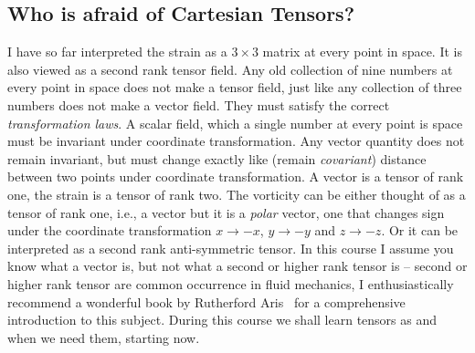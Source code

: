 \documentclass{tufte-book} %
\begin{document}
\begin{subappendices}
\section{Who is afraid of Cartesian Tensors?}
I have so far interpreted the strain as a $3\times 3$ matrix at every
point in space. It is also viewed as a second rank tensor field. 
Any old collection of nine numbers at every point in space does not
make a tensor field, just like any collection of three numbers does
not make a vector field. They must satisfy the correct
\textit{transformation laws}. 
 A scalar field, which a single number
at every point is space must be invariant under coordinate
transformation. Any vector quantity does not remain invariant, but must change
exactly like (remain \textit{covariant})  distance between two points
under coordinate transformation. A vector is a tensor of rank one, the
strain is a tensor of rank two. The vorticity can be either thought of
as a tensor of rank one, i.e., a vector but it is a \textit{polar}
vector, one that changes sign under the coordinate transformation
$x\to -x$, $y\to -y$ and $z\to -z$. Or it can be interpreted as a
second rank anti-symmetric tensor. In this course I assume you know
what a vector is, but not what a second or higher rank tensor is --
second or higher rank tensor are common occurrence in fluid mechanics,
I enthusiastically recommend a wonderful book by Rutherford
Aris~\cite{Aris} for a comprehensive introduction to this subject. 
During this course we shall learn tensors as and when we need them,
starting now. 


\end{subappendices}
\end{document}
